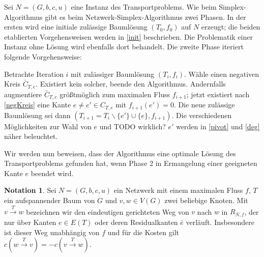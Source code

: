 \documentclass[a4paper,twoside,ngerman]{report}
\theoremstyle{plain}
\theoremstyle{definition}
\newtheorem*{nota}{Notation}
\begin{document}
Sei $N=(G,b,c,u)$ eine Instanz des Transportproblems. Wie beim Simplex-Algorithmus gibt es beim Netzwerk-Simplex-Algorithmus zwei Phasen. In der ersten wird eine initiale zulässige Baumlösung $(T_0,f_0)$ auf $N$ erzeugt; die beiden etablierten Vorgehensweisen werden in \cref{init} beschrieben. Die Problematik einer Instanz ohne Lösung wird ebenfalls dort behandelt. Die zweite Phase iteriert folgende Vorgehensweise:

Betrachte Iteration $i$ mit zulässiger Baumlösung $(T_i,f_i)$. Wähle einen negativen Kreis $\bar{C}_{T,e}$. Existiert kein solcher, beende den Algorithmus. Andernfalls augmentiere $\bar{C}_{T,e}$ größtmöglich zum maximalen Fluss $f_{i+1}$; jetzt existiert nach \cref{negKreis} eine Kante $e\neq e'\in C_{T,e}$ mit $f_{i+1}(e')=0$. Die neue zulässige Baumlösung sei dann $(T_{i+1}=T_i\backslash\{e'\}\cup\{e\},f_{i+1})$. Die verschiedenen Möglichkeiten zur Wahl von $e$ und TODO wirklich? $e'$ werden in \cref{pivot} und \cref{deg} näher beleuchtet.

Wir werden nun beweisen, dass der Algorithmus eine optimale Lösung des Transportproblems gefunden hat, wenn Phase 2 in Ermangelung einer geeigneten Kante $e$ beendet wird.

\begin{nota}Sei $N=(G,b,c,u)$ ein Netzwerk mit einem maximalen Fluss $f$, $T$ ein aufspannender Baum von $G$ und $v,w\in V(G)$ zwei beliebige Knoten. Mit $v\xrightarrow{T}w$ bezeichnen wir den eindeutigen gerichteten Weg von $v$ nach $w$ in $R_{N,f}$, der nur über Kanten $e\in E(T)$ oder deren Residualkanten $\bar{e}$ verläuft. Insbesondere ist dieser Weg unabhängig von $f$ und für die Kosten gilt $c(w\xrightarrow{T}v) = -c(v\xrightarrow{T}w)$.\end{nota}
\end{document}
